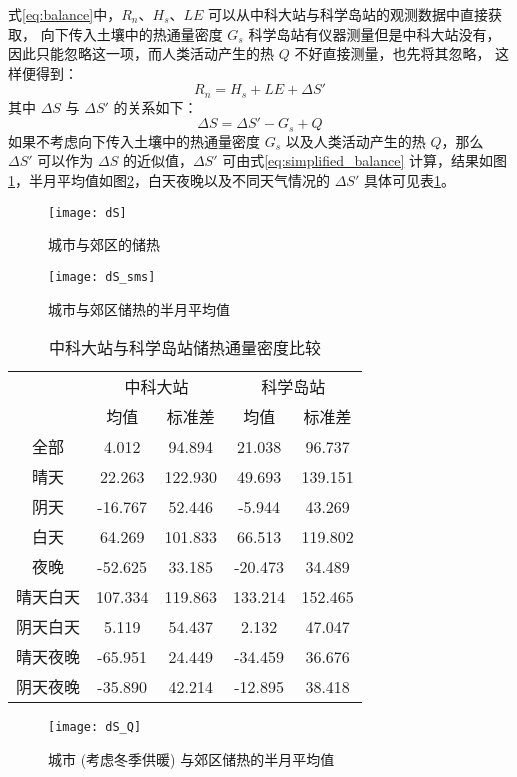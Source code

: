 式\ref{eq:balance}中，\(R_n\)、\(H_s\)、\(LE\) 可以从中科大站与科学岛站的观测数据中直接获取，
向下传入土壤中的热通量密度 \(G_s\) 科学岛站有仪器测量但是中科大站没有，
因此只能忽略这一项，而人类活动产生的热 \(Q\) 不好直接测量，也先将其忽略，
这样便得到：
\begin{equation}\label{eq:simplified_balance}
  R_n = H_s + LE + \Delta S'
\end{equation}
其中 \(\Delta S\) 与 \(\Delta S'\) 的关系如下：
\begin{equation}\label{eq:dS_dS'}
  \Delta S = \Delta S' - G_s + Q
\end{equation}
如果不考虑向下传入土壤中的热通量密度 \(G_s\) 以及人类活动产生的热 \(Q\)，那么 \(\Delta S'\) 可以作为 \(\Delta S\) 的近似值，\(\Delta S'\) 可由式\ref{eq:simplified_balance} 计算，结果如图\ref{fig:dS}，半月平均值如图\ref{fig:dS_sms}，白天夜晚以及不同天气情况的 \(\Delta S'\) 具体可见表\ref{tab:dS}。
\begin{figure}[H]
\centering
\texttt{[image: dS]}
\caption{城市与郊区的储热}\label{fig:dS}
\end{figure}
\begin{figure}[H]
\centering
\texttt{[image: dS\_sms]}
\caption{城市与郊区储热的半月平均值}\label{fig:dS_sms}
\end{figure}
\begin{table}[H]
\centering
\caption{中科大站与科学岛站储热通量密度比较}\label{tab:dS}
\begin{tabular}{ccccc}
  \toprule
  & \multicolumn{2}{c}{中科大站} & \multicolumn{2}{c}{科学岛站}\\
  \cmidrule(r){2-3} \cmidrule(r){4-5}
  & 均值 & 标准差 & 均值 & 标准差\\
  \midrule
  全部 & 4.012 & 94.894 & 21.038 & 96.737\\
  晴天 & 22.263 & 122.930 & 49.693 & 139.151\\
  阴天 & -16.767 & 52.446 & -5.944 & 43.269\\
  白天 & 64.269 & 101.833 & 66.513 & 119.802\\
  夜晚 & -52.625 & 33.185 & -20.473 & 34.489\\
  晴天白天 & 107.334 & 119.863 & 133.214 & 152.465\\
  阴天白天 & 5.119 & 54.437 & 2.132 & 47.047\\
  晴天夜晚 & -65.951 & 24.449 & -34.459 & 36.676\\
  阴天夜晚 & -35.890 & 42.214 & -12.895 & 38.418\\
  \bottomrule
\end{tabular}
\end{table}
\begin{figure}[H]
\centering
\texttt{[image: dS\_Q]}
\caption{城市 (考虑冬季供暖) 与郊区储热的半月平均值}\label{fig:dS_Q}
\end{figure}

